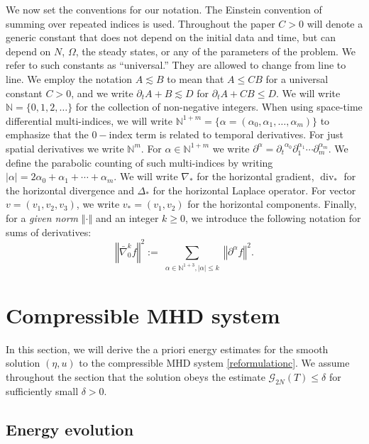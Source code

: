 \documentclass[a4paper,reqno,11pt]{amsart}
\numberwithin{equation}{section}
\providecommand{\abs}[1]{\left\vert#1\right\vert}
\providecommand{\norm}[1]{\left\Vert#1\right\Vert}
\providecommand{\norm}[1]{\left\Vert#1\right\Vert}
\begin{document}
\hspace{-13pt}{\bf Notation.}
We now set the conventions for our notation. The Einstein convention of summing over repeated indices is used. Throughout the paper $C>0$ will denote a generic constant that does not depend on the initial data and time, but can depend on $N$, $\Omega$, the steady states, or any of the parameters of the problem.  We refer to such constants as ``universal.''  They are allowed to change from line to line. We employ the notation $A {\lesssim} B$ to mean that $A \le C B$ for a universal constant $C>0$, and we write ${\partial_t} A+B{\lesssim} D$ for ${\partial_t} A+CB\le D$. We will write $\mathbb{N} = \{ 0,1,2,\dotsc\}$ for the collection of non-negative integers.  When using space-time differential multi-indices, we will write $\mathbb{N}^{1+m} = \{ \alpha = (\alpha_0,\alpha_1,\dotsc,\alpha_m) \}$ to emphasize that the $0-$index term is related to temporal derivatives.  For just spatial derivatives we write $\mathbb{N}^m$.  For $\alpha \in \mathbb{N}^{1+m}$ we write $\partial^\alpha = {\partial_t}^{\alpha_0} {\partial}_1^{\alpha_1}\cdots {\partial}_m^{\alpha_m}.$ We define the parabolic counting of such multi-indices by writing $\abs{\alpha} = 2 \alpha_0 + \alpha_1 + \cdots + \alpha_m.$  We will write $\nabla_\ast$ for the horizontal gradient, $\operatorname{div}_\ast$ for the horizontal divergence and $\Delta_\ast$ for the horizontal Laplace operator. For vector $v=(v_1,v_2,v_3)$, we write $v_\ast=(v_1,v_2)$ for the horizontal components. Finally, for a \textit{given norm} $\norm{\cdot}$ and an integer $k\ge 0$, we introduce the following notation for sums of derivatives:
\begin{equation} \nonumber
\norm{\bar{\nabla}^k_0 f}^2 := \sum_{\substack{\alpha \in \mathbb{N}^{1+3}, \abs{\alpha}\le k} } \norm{{\partial}^{\alpha}  f}^2.
\end{equation}

\section{Compressible MHD system}

In this section, we will derive the a priori energy estimates for the smooth solution $(\eta,u)$ to the compressible MHD system \eqref{reformulationc}. We assume throughout the section that the solution obeys the estimate $\mathcal{G}_{2N}(T) \le \delta$ for sufficiently small $\delta>0$.

\subsection{Energy evolution}\label{sec_horizc}
\end{document}
